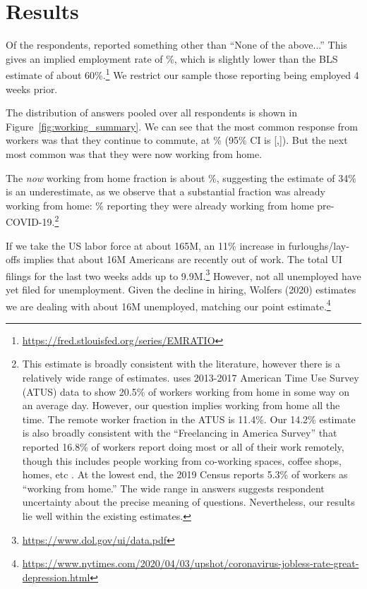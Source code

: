 \documentclass[12pt]{article}
\begin{document}
\section{Results}

Of the respondents, \numObsWorking{} reported something other than ``None of the above...''
This gives an implied employment rate of \LFPRhat{}\%, which is slightly lower than the BLS estimate of about 60\%.\footnote{
  \url{https://fred.stlouisfed.org/series/EMRATIO}
}
We restrict our sample those reporting being employed 4 weeks prior.

The distribution of answers pooled over all respondents is shown in Figure~\ref{fig:working_summary}. 
We can see that the most common response from workers was that they continue to commute, at \stillCommute{}\% (95\% CI is [\stillCommuteLB,\stillCommuteUB]). 
But the next most common was that they were now working from home. 

The \emph{now} working from home fraction is about \WFH{}\%, suggesting the \cite{dingel2020} estimate of 34\% is an underestimate, as we observe that a substantial fraction was already working from home: \alreadyWFH{}\% reporting they were already working from home pre-COVID-19.\footnote{

This estimate is broadly consistent with the literature, however there is a relatively wide range of estimates.
\cite{krantz2019did} uses 2013-2017 American Time Use Survey (ATUS) data to show 20.5\% of workers working from home in some way on an average day.
However, our question implies working from home all the time.
The remote worker fraction in the ATUS is 11.4\%.
Our 14.2\% estimate is also broadly consistent with the ``Freelancing in America Survey'' that reported 16.8\% of workers report doing most or all of their work remotely, though this includes people working from co-working spaces, coffee shops, homes, etc \citep{ozimek2020}.
At the lowest end, the 2019 Census reports 5.3\% of workers as ``working from home.''
The wide range in answers suggests respondent uncertainty about the precise meaning of questions. Nevertheless, our results lie well within the existing estimates.
}

If we take the US labor force at about 165M, an 11\% increase in furloughs/lay-offs implies that about 16M Americans are recently out of work.
The total UI filings for the last two weeks adds up to 9.9M.\footnote{
  \url{https://www.dol.gov/ui/data.pdf}
}
However, not all unemployed have yet filed for unemployment.
Given the decline in hiring, Wolfers (2020) estimates we are dealing with about 16M unemployed, matching our point estimate.\footnote{
  \url{https://www.nytimes.com/2020/04/03/upshot/coronavirus-jobless-rate-great-depression.html}
}
\end{document}
